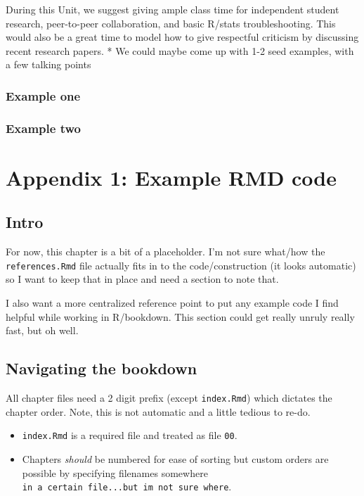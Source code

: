\documentclass[
]{book}
\begin{document}
During this Unit, we suggest giving ample class time for independent student research, peer-to-peer collaboration, and basic R/stats troubleshooting. This would also be a great time to model how to give respectful criticism by discussing recent research papers.
* We could maybe come up with 1-2 seed examples, with a few talking points

\hypertarget{example-one}{%
\subsection{Example one}\label{example-one}}

\hypertarget{example-two}{%
\subsection{Example two}\label{example-two}}

\hypertarget{ex_code}{%
\chapter*{Appendix 1: Example RMD code}\label{ex_code}}

\hypertarget{intro}{%
\section*{Intro}\label{intro}}

For now, this chapter is a bit of a placeholder. I'm not sure what/how
the \texttt{references.Rmd} file actually fits in to the code/construction (it
looks automatic) so I want to keep that in place and need a section to
note that.

I also want a more centralized reference point to put any example code I
find helpful while working in R/bookdown. This section could get really
unruly really fast, but oh well.

\hypertarget{navigating-the-bookdown}{%
\section*{Navigating the bookdown}\label{navigating-the-bookdown}}

All chapter files need a 2 digit prefix (except \texttt{index.Rmd}) which
dictates the chapter order. Note, this is not automatic and a little
tedious to re-do.

\begin{itemize}
\item
  \texttt{index.Rmd} is a required file and treated as file
  \texttt{00}.
\item
  Chapters \emph{should} be numbered for ease of sorting but custom
  orders are possible by specifying filenames somewhere \texttt{in\ a\ certain\ file...but\ i\textquotesingle{}m\ not\ sure\ where}.
\end{itemize}
\end{document}
